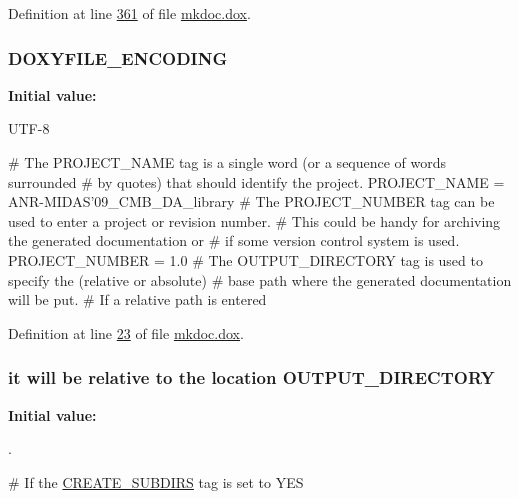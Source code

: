 Definition at line \hyperlink{mkdoc_8dox_source_l00361}{361} of file \hyperlink{mkdoc_8dox_source}{mkdoc.\-dox}.

\hypertarget{mkdoc_8dox_ac50780facdab5a469895066bc087eea5}{
\subsubsection[{D\-O\-X\-Y\-F\-I\-L\-E\-\_\-\-E\-N\-C\-O\-D\-I\-N\-G}]{\setlength{\rightskip}{0pt plus 5cm}D\-O\-X\-Y\-F\-I\-L\-E\-\_\-\-E\-N\-C\-O\-D\-I\-N\-G}}\label{mkdoc_8dox_ac50780facdab5a469895066bc087eea5}
{\bfseries Initial value\-:}
\begin{DoxyCode}
 UTF-8

\textcolor{preprocessor}{# The PROJECT\_NAME tag is a single word (or a sequence of words surrounded }
\textcolor{preprocessor}{}\textcolor{preprocessor}{# by quotes) that should identify the project.}
\textcolor{preprocessor}{}
PROJECT\_NAME           = ANR-MIDAS\textcolor{stringliteral}{'09\_CMB\_DA\_library}
\textcolor{stringliteral}{}
\textcolor{stringliteral}{# The PROJECT\_NUMBER tag can be used to enter a project or revision number. }
\textcolor{stringliteral}{# This could be handy for archiving the generated documentation or }
\textcolor{stringliteral}{# if some version control system is used.}
\textcolor{stringliteral}{}
\textcolor{stringliteral}{PROJECT\_NUMBER         = 1.0}
\textcolor{stringliteral}{}
\textcolor{stringliteral}{}
\textcolor{stringliteral}{# The OUTPUT\_DIRECTORY tag is used to specify the (relative or absolute) }
\textcolor{stringliteral}{# base path where the generated documentation will be put. }
\textcolor{stringliteral}{# If a relative path is entered}
\end{DoxyCode}


Definition at line \hyperlink{mkdoc_8dox_source_l00023}{23} of file \hyperlink{mkdoc_8dox_source}{mkdoc.\-dox}.

\hypertarget{mkdoc_8dox_a0210526ada4ed067410fb4f078b8ae3f}{
\subsubsection[{O\-U\-T\-P\-U\-T\-\_\-\-D\-I\-R\-E\-C\-T\-O\-R\-Y}]{\setlength{\rightskip}{0pt plus 5cm}it will be relative to the location O\-U\-T\-P\-U\-T\-\_\-\-D\-I\-R\-E\-C\-T\-O\-R\-Y}}\label{mkdoc_8dox_a0210526ada4ed067410fb4f078b8ae3f}
{\bfseries Initial value\-:}
\begin{DoxyCode}
 .

# If the \hyperlink{mkdoc_8dox_a77f3c876623f3cbb5ed96ca49ce6fe06}{CREATE\_SUBDIRS} tag is \textcolor{keyword}{set} to YES
\end{DoxyCode}


